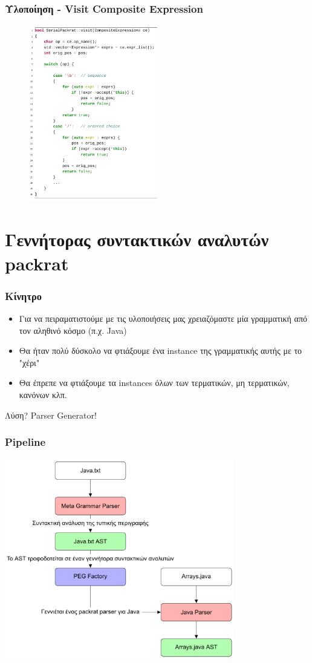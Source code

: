 \documentclass{beamer}
\begin{document}
\begin{frame}
  \frametitle{Υλοποίηση - Visit Composite Expression}
\begin{figure}[h]
    \centering
	\includegraphics[width=0.50\textwidth]{pics/ce}
\end{figure} 
\end{frame}
\iffalse
\section{Γεννήτορας συντακτικών αναλυτών packrat}

\begin{frame}
  \frametitle{Κίνητρο}
  \begin{itemize}
	\item Για να πειραματιστούμε με τις υλοποιήσεις μας χρειαζόμαστε μία γραμματική από τον αληθινό κόσμο (π.χ. Java) \pause
	\item Θα ήταν πολύ δύσκολο να φτιάξουμε ένα instance της γραμματικής αυτής με το "χέρι"
	\item Θα έπρεπε να φτιάξουμε τα instances όλων των τερματικών, μη τερματικών, κανόνων κλπ. \pause
  \end{itemize}
  Λύση? \pause Parser Generator!
\end{frame}

\begin{frame}
  \frametitle{Pipeline}
    \centering
	\includegraphics[width=0.75\textwidth]{pics/pipeline}
\end{frame}
\end{document}
